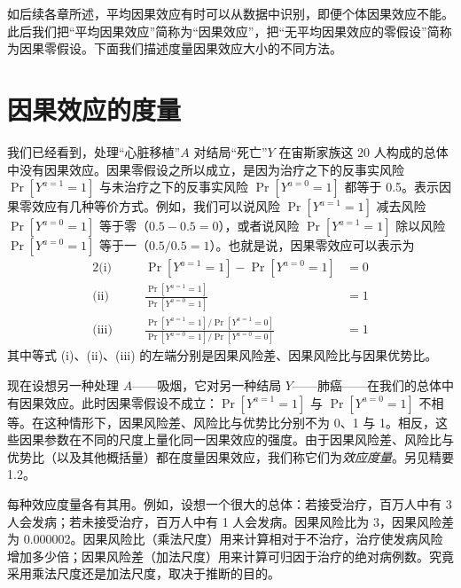 如后续各章所述，平均因果效应有时可以从数据中识别，即便个体因果效应不能。此后我们把“平均因果效应”简称为“因果效应”，把“无平均因果效应的零假设”简称为因果零假设。下面我们描述度量因果效应大小的不同方法。

\section{因果效应的度量}

我们已经看到，处理“心脏移植”$A$ 对结局“死亡”$Y$ 在宙斯家族这 20 人构成的总体中没有因果效应。因果零假设之所以成立，是因为治疗之下的反事实风险 $\Pr[Y^{a=1}=1]$ 与未治疗之下的反事实风险 $\Pr[Y^{a=0}=1]$ 都等于 0.5。表示因果零效应有几种等价方式。例如，我们可以说风险 $\Pr[Y^{a=1}=1]$ 减去风险 $\Pr[Y^{a=0}=1]$ 等于零（$0.5-0.5=0$），或者说风险 $\Pr[Y^{a=1}=1]$ 除以风险 $\Pr[Y^{a=0}=1]$ 等于一（$0.5/0.5=1$）。也就是说，因果零效应可以表示为
\begin{alignat*}{2}
\text{(i)}\quad && \Pr[Y^{a=1}=1]-\Pr[Y^{a=0}=1] &= 0\\
\text{(ii)}\quad && \frac{\Pr[Y^{a=1}=1]}{\Pr[Y^{a=0}=1]} &= 1\\
\text{(iii)}\quad && \frac{\Pr[Y^{a=1}=1]/\Pr[Y^{a=1}=0]}{\Pr[Y^{a=0}=1]/\Pr[Y^{a=0}=0]} &= 1
\end{alignat*}
其中等式 (i)、(ii)、(iii) 的左端分别是因果风险差、因果风险比与因果优势比。

现在设想另一种处理 $A$——吸烟，它对另一种结局 $Y$——肺癌——在我们的总体中有因果效应。此时因果零假设不成立：$\Pr[Y^{a=1}=1]$ 与 $\Pr[Y^{a=0}=1]$ 不相等。在这种情形下，因果风险差、风险比与优势比分别不为 0、1 与 1。相反，这些因果参数在不同的尺度上量化同一因果效应的强度。由于因果风险差、风险比与优势比（以及其他概括量）都在度量因果效应，我们称它们为\emph{效应度量}。另见精要 1.2。


每种效应度量各有其用。例如，设想一个很大的总体：若接受治疗，百万人中有 3 人会发病；若未接受治疗，百万人中有 1 人会发病。因果风险比为 3，因果风险差为 0.000002。因果风险比（乘法尺度）用来计算相对于不治疗，治疗使发病风险增加多少倍；因果风险差（加法尺度）用来计算可归因于治疗的绝对病例数。究竟采用乘法尺度还是加法尺度，取决于推断的目的。

